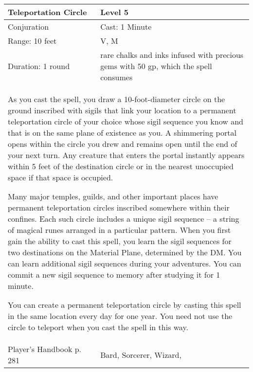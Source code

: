 \documentclass[11pt]{report}
\begin{document}
\begin{table}[H]
	\begin{tabular}{||p{6cm}|p{6cm}||}
		\hline\hline
		\bf{Teleportation Circle} & Level 5\\ \hline
		Conjuration & Cast: 1 Minute\\ \hline
		Range: 10 feet & V, M\\ \hline
		Duration: 1 round & rare chalks and inks infused with precious gems with 50 gp, which the spell consumes\\ \hline
		\multicolumn{2}{||p{12cm}||}{As you cast the spell, you draw a 10-foot-diameter circle on the ground inscribed with sigils that link your location to a permanent teleportation circle of your choice whose sigil sequence you know and that is on the same plane of existence as you.
A shimmering portal opens within the circle you drew and remains open until the end of your next turn. Any creature that enters the portal instantly appears within 5 feet of the destination circle or in the nearest unoccupied space if that space is occupied.

Many major temples, guilds, and other important places have permanent teleportation circles inscribed somewhere within their confines. Each such circle includes a unique sigil sequence – a string of magical runes arranged in a particular pattern. When you first gain the ability to cast this spell, you learn the sigil sequences for two destinations on the Material Plane, determined by the DM. You can learn additional sigil sequences during your adventures. You can commit a new sigil sequence to memory after studying it for 1 minute.

You can create a permanent teleportation circle by casting this spell in the same location every day for one year. You need not use the circle to teleport when you cast the spell in this way.}\\ \hline
Player's Handbook p. 281 & Bard, Sorcerer, Wizard, \\ \hline\hline
	\end{tabular}
\end{table}
\end{document}
